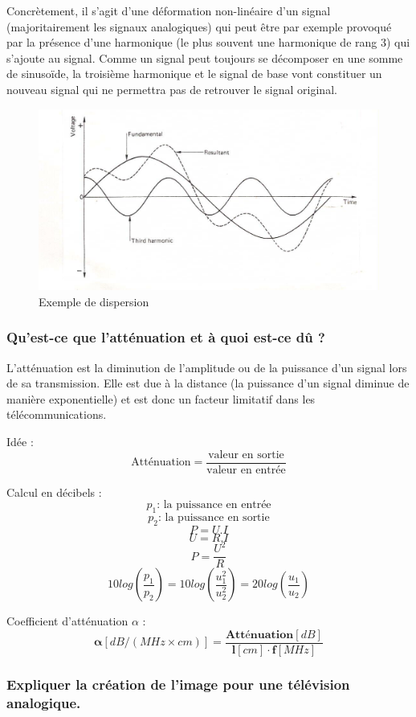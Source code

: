 Concrètement, il s'agit d'une déformation non-linéaire d'un signal (majoritairement les signaux analogiques) qui peut être par exemple provoqué par la présence d'une harmonique (le plus souvent une harmonique de rang 3) qui s'ajoute au signal. Comme un signal peut toujours se décomposer en une somme de sinusoïde, la troisième harmonique et le signal de base vont constituer un nouveau signal qui ne permettra pas de retrouver le signal original.

\begin{figure}[H]
    \centering
    \includegraphics[width=0.7\linewidth]{img/dispersion.png}
    \caption{Exemple de dispersion}
\end{figure}

\subsubsection{Qu'est-ce que l'atténuation et à quoi est-ce dû ?}

L'atténuation est la diminution de l'amplitude ou de la puissance d'un signal lors de sa transmission. Elle est due à la distance (la puissance d'un signal diminue de manière exponentielle) et est donc un facteur limitatif dans les télécommunications.

Idée :
\[
    \textrm{Atténuation} = \frac{\textrm{valeur en
    sortie}}{\textrm{valeur en entrée}}
\]
\bigskip

Calcul en décibels :
\[ p_1 \textrm{: la puissance en entrée} \]
\[ p_2 \textrm{: la puissance en sortie} \]
\[ P = U.I \]
\[ U = R.I \]
\[ P = \frac{U^{2}}{R} \]
\[
    10 log(\frac{p_1}{p_2}) = 10 log(\frac{u_1^2}{u_2^2}) = 20
    log(\frac{u_1}{u_2})
\]

Coefficient d'atténuation $\alpha$ : 
\[ \bm{\alpha} [dB/(MHz \times cm)] =
\frac{\bm{Atténuation} [dB]}{\mathbf{l} [cm] \cdot \mathbf{f} [MHz]} \]

\subsubsection{Expliquer la création de l'image pour une télévision
analogique.}

